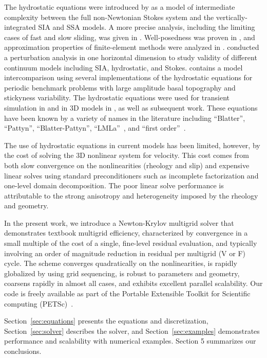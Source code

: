 \documentclass[final]{siamltex}
\newcommand{\citep}[1]{{\cite{#1}}}
\begin{document}
The hydrostatic equations were introduced by \cite{blatter1995vas} as a model of intermediate complexity between the full non-Newtonian Stokes system and the vertically-integrated SIA and SSA models.
A more precise analysis, including the limiting cases of fast and slow sliding, was given in \cite{schoof2010thin}.
Well-posedness was proven in \cite{colinge1999strongly}, and approximation properties of finite-element methods were analyzed in \cite{glowinski2003approximation,chow2004finite}.
\cite{hindmarsh2004numerical} conducted a perturbation analysis in one horizontal dimension to study validity of different continuum models including SIA, hydrostatic, and Stokes.
\cite{pattyn2008beh} contains a model intercomparison using several implementations of the hydrostatic equations for periodic benchmark problems with large amplitude basal topography and stickyness variability.
The hydrostatic equations were used for transient simulation in \cite{pattyn2002tgr} and in 3D models in \cite{pattyn2003ntd}, as well as subsequent work.
These equations have been known by a variety of names in the literature including ``Blatter'', ``Pattyn'', ``Blatter-Pattyn'', ``LMLa''~\citep{hindmarsh2004numerical}, and ``first order''~\citep{greve2009dynamics}.

The use of hydrostatic equations in current models has been limited, however, by the cost of solving the 3D nonlinear system for velocity.  This cost comes from both slow convergence on the
nonlinearities (rheology and slip) and expensive linear solves using standard preconditioners such
as incomplete factorization and one-level domain decomposition.  The poor linear solve performance is
attributable to the strong anisotropy and heterogeneity imposed by the rheology and geometry.

In the present work, we introduce a Newton-Krylov multigrid solver that demonstrates textbook
multigrid efficiency, characterized by convergence in a small multiple of the cost of a single,
fine-level residual evaluation, and typically involving an order of magnitude reduction in residual
per multigrid (V or F) cycle.  The scheme converges quadratically on the nonlinearities, is rapidly
globalized by using grid sequencing, is robust to parameters and geometry, coarsens rapidly in
almost all cases, and exhibits excellent parallel scalability.  Our code is freely available as part
of the Portable Extensible Toolkit for Scientific computing (PETSc)~\citep{petsc-web-page}.

Section~\ref{sec:equations} presents the equations and discretization, Section~\ref{sec:solver} describes the solver, and Section~\ref{sec:examples} demonstrates performance and scalability with numerical examples. Section 5 summarizes our conclusions.
\end{document}
